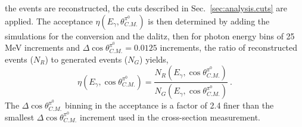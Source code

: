 		the events are reconstructed, the cuts described in Sec.~\ref{sec:analysis.cuts} are applied. The 
		acceptance $\eta(E_\gamma,\theta^{\pi^0}_{C.M.})$ is then determined by adding the simulations for the conversion and the dalitz, then for photon energy bins of 25 MeV 
		increments and $\Delta\cos\theta^{\pi^0}_{C.M.} = 0.0125$ increments, the ratio of reconstructed events ($N_R$) to generated events ($N_G$) yields,
		\begin{equation}\label{eq:acceptance}
		\eta(E_\gamma,\cos\theta^{\pi^0}_{C.M.}) = \frac{N_R(E_\gamma,\cos\theta^{\pi^0}_{C.M.})}{N_G(E_\gamma,\cos\theta^{\pi^0}_{C.M.})} \ .
		\end{equation}
		The $\Delta\cos\theta^{\pi^0}_{C.M.}$ binning in the acceptance is a factor of 2.4 finer than the smallest $\Delta\cos\theta^{\pi^0}_{C.M.}$ increment used in the 
		cross-section measurement.
